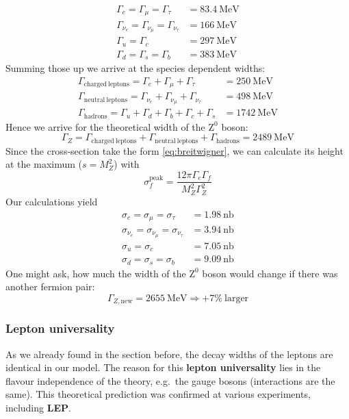 \begin{align*}
    \Gamma_e = \Gamma_\mu = \Gamma_\tau &= 83.4 \: \mathrm{MeV}   \\
    \Gamma_{\nu_e} = \Gamma_{\nu_\mu} = \Gamma_{\nu_\tau} &= 166 \: \mathrm{MeV}  \\
    \Gamma_u = \Gamma_c &= 297 \: \mathrm{MeV} \\
    \Gamma_d = \Gamma_s = \Gamma_b &= 383 \: \mathrm{MeV} 
\end{align*}
Summing those up we arrive at the species dependent widths:
\begin{align*}
    \Gamma_{\mathrm{charged \: leptons}} = \Gamma_e + \Gamma_\mu + \Gamma_\tau &= 250\: \mathrm{MeV} \\
    \Gamma_{\mathrm{neutral \: leptons}} = \Gamma_{\nu_e} + \Gamma_{\nu_\mu} + \Gamma_{\nu_\tau} &= 498 \: \mathrm{MeV} \\
    \Gamma_{\mathrm{hadrons}} = \Gamma_u + \Gamma_d + \Gamma_b + \Gamma_c + \Gamma_s &= 1742 \: \mathrm{MeV} 
\end{align*}
Hence we arrive for the theoretical width of the $\mathrm{Z^0}$ boson:
\begin{equation*}
    \Gamma_Z = \Gamma_{\mathrm{charged \: leptons}} + \Gamma_{\mathrm{neutral \: leptons}}  + \Gamma_{\mathrm{hadrons}} = 2489 \: \mathrm{MeV}
\end{equation*}
Since the cross-section take the form \eqref{eq:breitwigner}, we can calculate its height at the maximum ($s = M_Z^2$) with
\begin{equation*}
    \sigma_f^{\mathrm{peak}} = \frac{12\pi \Gamma_e \Gamma_f }{M_Z^2 \Gamma_Z^2}
\end{equation*}
Our calculations yield
\begin{align*}
     \label{eq:peaks}
     \sigma_e = \sigma_\mu = \sigma_\tau &= 1.98 \: \mathrm{nb} \\
     \sigma_{\nu_e} = \sigma_{\nu_\mu} = \sigma_{\nu_\tau} &= 3.94 \: \mathrm{nb} \\
     \sigma_u = \sigma_c &= 7.05 \: \mathrm{nb} \\
     \sigma_d = \sigma_s = \sigma_b &= 9.09\: \mathrm{nb} 
    \end{align*}
 One might ask, how much the width of the $\mathrm{Z^0}$ boson would change if there was another fermion pair:
 \begin{equation*}
 \Gamma_{Z, \mathrm{new}} = 2655 \: \mathrm{MeV} \Rightarrow +7\% \: \text{larger}
 \end{equation*}
\subsubsection{Lepton universality}
\label{sub:lepton_universality}
As we already found in the section before, the decay widths of the leptons are identical in our model. The reason for this
\textbf{lepton universality} lies in the flavour independence of the theory, e.g.\ the gauge bosons (interactions are the same).
This theoretical prediction was confirmed at various experiments, including \textbf{LEP}.

